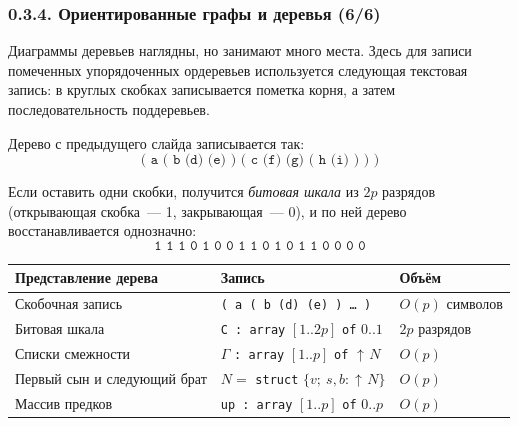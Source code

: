 \documentclass[mathserif,12pt,aspectratio=169]{beamer}
\def\emразделенной{\em разделенной}
\def\em#1{\it\color{blue}#1}
\def\Pointer{\operatorname{\uparrow\!}}
\begin{document}
\begin{frame}
\frametitle{0.3.4. Ориентированные графы и деревья (6/6)}

Диаграммы деревьев наглядны, но занимают много места. Здесь для записи помеченных
упорядоченных ордеревьев используется следующая текстовая запись: в круглых
скобках записывается пометка корня, а затем последовательность поддеревьев.

\begin{example}
Дерево с предыдущего слайда записывается так:
\vspace{-8pt}
$$\texttt{( a ( b (d) (e) ) ( c (f) (g) ( h (i) ) ) )}$$
\vspace{-20pt}

Если оставить одни скобки, получится {\em битовая шкала} из $2p$ разрядов
(открывающая скобка~--- 1, закрывающая~--- 0), и по ней дерево восстанавливается
однозначно:
\vspace{-8pt}
$$\texttt{1 1 1 0 1 0 0 1 1 0 1 0 1 1 0 0 0 0}$$
\end{example}
\vspace{-16pt}

\begin{center}\scriptsize
\begin{tabular}{|l|l|l|}
\hline
Представление дерева & Запись & Объём \\
\hline
Скобочная запись & \texttt{( a ( b (d) (e) ) \dots\ )} & $O(p)$ символов \\
Битовая шкала & \texttt{C : array} $[1..2p]$ \texttt{of} $0..1$ & $2p$ разрядов \\
Списки смежности & $\Gamma$ \texttt{: array} $[1..p]$ \texttt{of} $\Pointer N$ &
$O(p)$ \\
Первый сын и следующий брат & $N=$ \texttt{struct} $\{v;\ s,b:\Pointer N\}$ &
$O(p)$ \\
Массив предков & \texttt{up : array} $[1..p]$ \texttt{of} $0..p$ & $O(p)$ \\
\hline
\end{tabular}
\end{center}
\end{frame}

\end{document}
